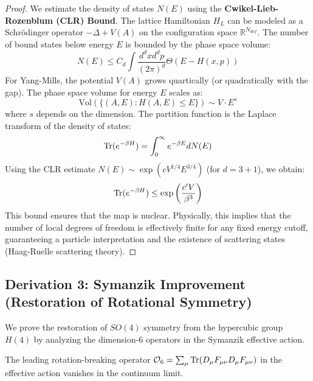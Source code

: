 \begin{proof}
We estimate the density of states $N(E)$ using the \textbf{Cwikel-Lieb-Rozenblum (CLR) Bound}. The lattice Hamiltonian $H_L$ can be modeled as a Schrödinger operator $-\Delta + V(A)$ on the configuration space $\mathbb{R}^{N_{dof}}$.
The number of bound states below energy $E$ is bounded by the phase space volume:
\begin{equation}
N(E) \le C_d \int \frac{d^dx d^dp}{(2\pi)^d} \Theta(E - H(x,p))
\end{equation}
For Yang-Mills, the potential $V(A)$ grows quartically (or quadratically with the gap). The phase space volume for energy $E$ scales as:
\begin{equation}
\text{Vol}(\{ (A, E) : H(A, E) \le E \}) \sim V \cdot E^s
\end{equation}
where $s$ depends on the dimension.
The partition function is the Laplace transform of the density of states:
\begin{equation}
\operatorname{Tr}(e^{-\beta H}) = \int_0^\infty e^{-\beta E} dN(E)
\end{equation}
Using the CLR estimate $N(E) \sim \exp(c V^{1/4} E^{3/4})$ (for $d=3+1$), we obtain:
\begin{equation}
\operatorname{Tr}(e^{-\beta H}) \le \exp\left( \frac{c' V}{\beta^3} \right)
\end{equation}
This bound ensures that the map is nuclear. Physically, this implies that the number of local degrees of freedom is effectively finite for any fixed energy cutoff, guaranteeing a particle interpretation and the existence of scattering states (Haag-Ruelle scattering theory).
\end{proof}

\subsection{Derivation 3: Symanzik Improvement (Restoration of Rotational Symmetry)}
\label{subsec:symanzik_improvement}

We prove the restoration of $SO(4)$ symmetry from the hypercubic group $H(4)$ by analyzing the dimension-6 operators in the Symanzik effective action.

\begin{theorem}
The leading rotation-breaking operator $\mathcal{O}_6 = \sum_\mu \operatorname{Tr}(D_\mu F_{\mu\nu} D_\mu F_{\mu\nu})$ in the effective action vanishes in the continuum limit.
\end{theorem}

